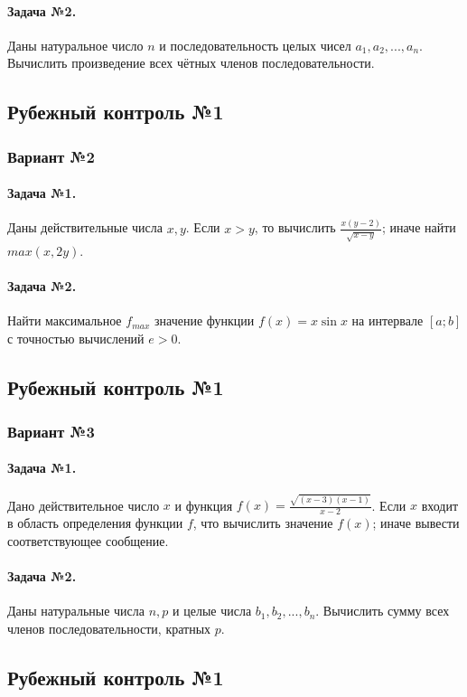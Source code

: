 \documentclass[12pt,a4paper]{report}
\begin{document}
\paragraph*{Задача №2.} Даны натуральное число $n$ и последовательность целых чисел $a_1, a_2, ..., a_n$. Вычислить произведение всех чётных членов последовательности.

\subsection*{Рубежный контроль №1}
\subsubsection*{Вариант №2}
\paragraph*{Задача №1.} Даны действительные числа $x, y$. Если $x > y$, то вычислить $\frac { x (y - 2) } { \sqrt { x - y } } $; иначе найти $max(x, 2y)$.
\paragraph*{Задача №2.} Найти максимальное $f_{max}$ значение функции $f(x)=x \sin x$ на интервале $[a; b]$ с точностью вычислений $e>0$.

\subsection*{Рубежный контроль №1}
\subsubsection*{Вариант №3}
\paragraph*{Задача №1.} Дано действительное число $x$ и функция $f(x) = \frac { \sqrt { (x - 3)(x - 1) } } {x - 2}$. Если $x$ входит в область определения функции $f$, что вычислить значение $f(x)$; иначе вывести соответствующее сообщение.
\paragraph*{Задача №2.} Даны натуральные числа $n, p$ и целые числа $b_1, b_2, ..., b_n$. Вычислить сумму всех членов последовательности, кратных $p$.

\subsection*{Рубежный контроль №1}
\end{document}
